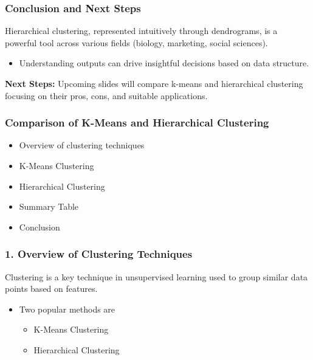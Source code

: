 \documentclass[aspectratio=169]{beamer}
\begin{document}
\begin{frame}[fragile]
    \frametitle{Conclusion and Next Steps}
    Hierarchical clustering, represented intuitively through dendrograms, is a powerful tool across various fields (biology, marketing, social sciences).
    \begin{itemize}
        \item Understanding outputs can drive insightful decisions based on data structure.
    \end{itemize}
    \textbf{Next Steps:} Upcoming slides will compare k-means and hierarchical clustering focusing on their pros, cons, and suitable applications.
\end{frame}

\begin{frame}[fragile]
    \frametitle{Comparison of K-Means and Hierarchical Clustering}
    \begin{itemize}
        \item Overview of clustering techniques
        \item K-Means Clustering
        \item Hierarchical Clustering
        \item Summary Table
        \item Conclusion
    \end{itemize}
\end{frame}

\begin{frame}[fragile]
    \frametitle{1. Overview of Clustering Techniques}
    Clustering is a key technique in unsupervised learning used to group similar data points based on features.
    \begin{itemize}
        \item Two popular methods are
        \begin{itemize}
            \item K-Means Clustering
            \item Hierarchical Clustering
        \end{itemize}
    \end{itemize}
\end{frame}
\end{document}
